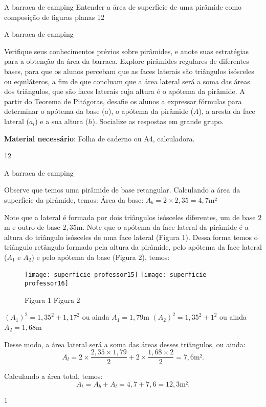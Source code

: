 \begin{objectives}{A barraca de camping}
{
  Entender a área de superfície de uma pirâmide como composição de figuras planas
}{1}{2}
\end{objectives}
\begin{sugestions}{A barraca de camping}
{
Verifique seus conhecimentos prévios sobre pirâmides, e anote suas estratégias para a obtenção da área da barraca. Explore pirâmides regulares de diferentes bases, para que os alunos percebam que as faces laterais são triângulos isósceles ou equiláteros, a fim de que concluam que a área lateral será a soma das áreas dos triângulos, que são faces laterais cuja altura é o apótema da pirâmide. A partir do Teorema de Pitágoras, desafie os alunos a expressar fórmulas para determinar o apótema da base ($a$), o apótema da pirâmide ($A$), a aresta da face lateral ($a_l$) e a sua altura ($h$). Socialize as respostas em grande grupo. 

\textbf{Material necessário}: Folha de caderno ou A4, calculadora.

}{1}{2}
\end{sugestions}
\clearmargin
\begin{answer}{A barraca de camping}
{
  Observe que temos uma pirâmide de base retangular. Calculando a área da superfície da pirâmide, temos: Área da base: $A_b=2\times2{,}35=4,7$m²

Note que a lateral é formada por dois triângulos isósceles diferentes, um de base $2$m e outro de base $2{,}35$m. Note que o apótema da face lateral da pirâmide é a altura do triângulo isósceles de uma face lateral (Figura 1). Dessa forma temos o triângulo retângulo formado pela altura da pirâmide, pelo apótema da face lateral ($A_1$  e $ A_2$) e pelo apótema da base (Figura 2), temos:

\begin{figure}[H]
\centering

\resizebox{.9\linewidth}{!}
{
  \texttt{[image: superficie-professor15]}
  \texttt{[image: superficie-professor16]}
}

\vspace{.3em}
Figura 1 \hspace{.3\linewidth} Figura 2
\end{figure}

$(A_1)^2=1{,}35^2+1{,}17^2$ ou ainda $A_1=1{,}79$m $(A_2)^2=1{,}35^2+1^2$ ou ainda $A_2=1{,}68$m 

Desse modo, a área lateral será a soma das áreas desses triângulos, ou ainda:
\begin{equation*}
A_l=2\times\frac{2{,}35\times1{,}79}{2}+2\times\frac{1{,}68\times2}{2}=7{,}6\text{m²}.
\end{equation*}

Calculando a área total, temos: 
\begin{equation*}
A_t=A_b+A_l=4{,}7+7{,}6=12{,}3\text{m²}.
\end{equation*}

}{1}
\end{answer}
